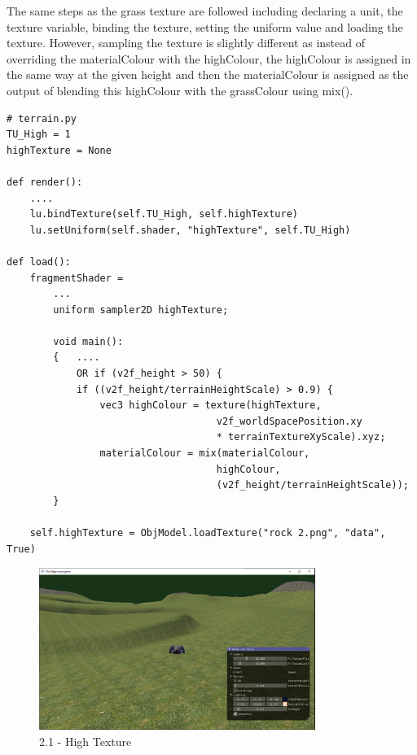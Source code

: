 \documentclass[a4 paper, 12pt]{article}
\begin{document}
The same steps as the grass texture are followed including declaring a unit, the texture variable, binding the texture, setting the uniform value and loading the texture. However, sampling the texture is slightly different as instead of overriding the materialColour with the highColour, the highColour is assigned in the same way at the given height and then the materialColour is assigned as the output of blending this highColour with the grassColour using mix().
\begin{lstlisting}
# terrain.py
TU_High = 1
highTexture = None

def render():
    ....
    lu.bindTexture(self.TU_High, self.highTexture)
    lu.setUniform(self.shader, "highTexture", self.TU_High)

def load():
    fragmentShader = 
        ...
        uniform sampler2D highTexture;

        void main():
        {   ....
            OR if (v2f_height > 50) {
            if ((v2f_height/terrainHeightScale) > 0.9) {
                vec3 highColour = texture(highTexture, 
                                    v2f_worldSpacePosition.xy 
                                    * terrainTextureXyScale).xyz;
                materialColour = mix(materialColour, 
                                    highColour, 
                                    (v2f_height/terrainHeightScale));
        } 
    
    self.highTexture = ObjModel.loadTexture("rock 2.png", "data", True)        
        \end{lstlisting}

    \begin{figure} [H]
        \centering
        \includegraphics[width=0.8\textwidth, frame]
            {./images/mega_racer/2.1_a.PNG}
        \caption{2.1 - High Texture}   
    \end{figure}
\end{document}
